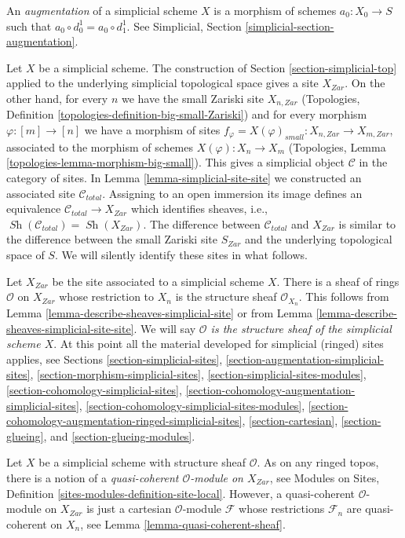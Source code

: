\documentclass{stacks-project}
\theoremstyle{plain}
\theoremstyle{definition}
\theoremstyle{remark}
\numberwithin{equation}{subsection}
\def\Sh{\mathop{\mathit{Sh}}\nolimits}
\begin{document}
\medskip\noindent
An {\it augmentation} of a simplicial scheme $X$ is a morphism
of schemes $a_0 : X_0 \to S$ such that $a_0 \circ d^1_0 = a_0 \circ d^1_1$.
See Simplicial, Section \ref{simplicial-section-augmentation}.

\medskip\noindent
Let $X$ be a simplicial scheme. The construction of
Section \ref{section-simplicial-top} applied to the underlying
simplicial topological space gives a site $X_{Zar}$.
On the other hand, for every $n$ we have the small Zariski site
$X_{n, Zar}$ (Topologies, Definition
\ref{topologies-definition-big-small-Zariski})
and for every morphism $\varphi : [m] \to [n]$
we have a morphism of sites
$f_\varphi = X(\varphi)_{small} : X_{n, Zar} \to X_{m, Zar}$,
associated to the morphism of schemes
$X(\varphi) : X_n \to X_m$ (Topologies, Lemma
\ref{topologies-lemma-morphism-big-small}).
This gives a simplicial object $\mathcal{C}$ in the category of sites.
In Lemma \ref{lemma-simplicial-site-site} we constructed an associated
site $\mathcal{C}_{total}$. Assigning to an open immersion its image
defines an equivalence $\mathcal{C}_{total} \to X_{Zar}$ which
identifies sheaves, i.e., $\Sh(\mathcal{C}_{total}) = \Sh(X_{Zar})$.
The difference between $\mathcal{C}_{total}$ and $X_{Zar}$
is similar to the difference between the small Zariski site $S_{Zar}$
and the underlying topological space of $S$.
We will silently identify these sites in what follows.

\medskip\noindent
Let $X_{Zar}$ be the site associated to a simplicial scheme $X$.
There is a sheaf of rings $\mathcal{O}$ on $X_{Zar}$ whose restriction
to $X_n$ is the structure sheaf $\mathcal{O}_{X_n}$. This follows
from Lemma \ref{lemma-describe-sheaves-simplicial-site} or from
Lemma \ref{lemma-describe-sheaves-simplicial-site-site}. We will say
{\it $\mathcal{O}$ is the structure sheaf of the simplicial scheme $X$}.
At this point all the material developed for simplicial (ringed) sites
applies, see Sections \ref{section-simplicial-sites},
\ref{section-augmentation-simplicial-sites},
\ref{section-morphism-simplicial-sites},
\ref{section-simplicial-sites-modules},
\ref{section-cohomology-simplicial-sites},
\ref{section-cohomology-augmentation-simplicial-sites},
\ref{section-cohomology-simplicial-sites-modules},
\ref{section-cohomology-augmentation-ringed-simplicial-sites},
\ref{section-cartesian},
\ref{section-glueing}, and
\ref{section-glueing-modules}.

\medskip\noindent
Let $X$ be a simplicial scheme with structure sheaf $\mathcal{O}$.
As on any ringed topos, there is a notion
of a {\it quasi-coherent $\mathcal{O}$-module on $X_{Zar}$}, see
Modules on Sites, Definition \ref{sites-modules-definition-site-local}.
However, a quasi-coherent $\mathcal{O}$-module on $X_{Zar}$ is
just a cartesian $\mathcal{O}$-module $\mathcal{F}$ whose restrictions
$\mathcal{F}_n$ are quasi-coherent on $X_n$, see
Lemma \ref{lemma-quasi-coherent-sheaf}.
\end{document}
